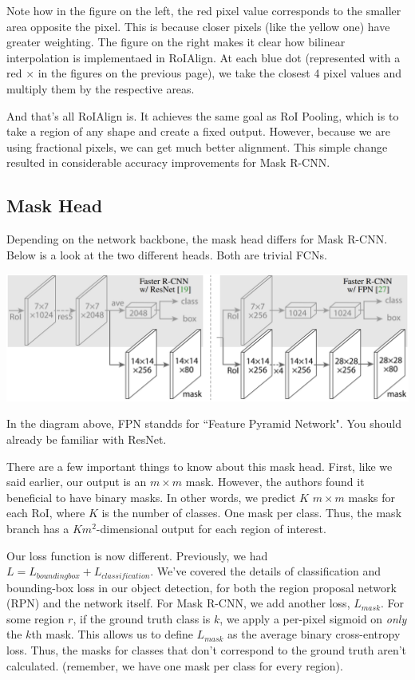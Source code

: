 \documentclass{article}
\begin{document}
Note how in the figure on the left, the red pixel value corresponds to the smaller area opposite the pixel. This is because closer pixels (like the yellow one) have greater weighting.
The figure on the right makes it clear how bilinear interpolation is implementaed in RoIAlign. At each blue dot (represented with a red $\times$ in the figures on the previous page), we take the closest 4 pixel values and multiply them by the respective areas.

And that's all RoIAlign is. It achieves the same goal as RoI Pooling, which is to take a region of any shape and create a fixed output. However, because we are using fractional pixels, we can get much better alignment. This simple change resulted in considerable accuracy improvements for Mask R-CNN.

\subsection{Mask Head}
Depending on the network backbone, the mask head differs for Mask R-CNN. Below is a look at the two different heads. Both are trivial FCNs.

\begin{center}
\includegraphics[scale=0.3]{backbones.PNG}
\end{center}

In the diagram above, FPN standds for ``Feature Pyramid Network". You should already be familiar with ResNet.

There are a few important things to know about this mask head. First, like we said earlier, our output is an $m\times m$ mask. However, the authors found it beneficial to have binary masks. In other words, we predict $K$ $m\times m$ masks for each RoI, where $K$ is the number of classes. One mask per class. Thus, the mask branch has a $Km^2$-dimensional output for each region of interest.

Our loss function is now different. Previously, we had $L = L_{boundingbox} + L_{classification}$. We've covered the details of classification and bounding-box loss in our object detection, for both the region proposal network (RPN) and the network itself. For Mask R-CNN, we add another loss, $L_{mask}$. For some region $r$, if the ground truth class is $k$, we apply a per-pixel sigmoid on \textit{only} the $k$th mask. This allows us to define $L_{mask}$ as the average binary cross-entropy loss. Thus, the masks for classes that don't correspond to the ground truth aren't calculated. (remember, we have one mask per class for every region).
\end{document}
